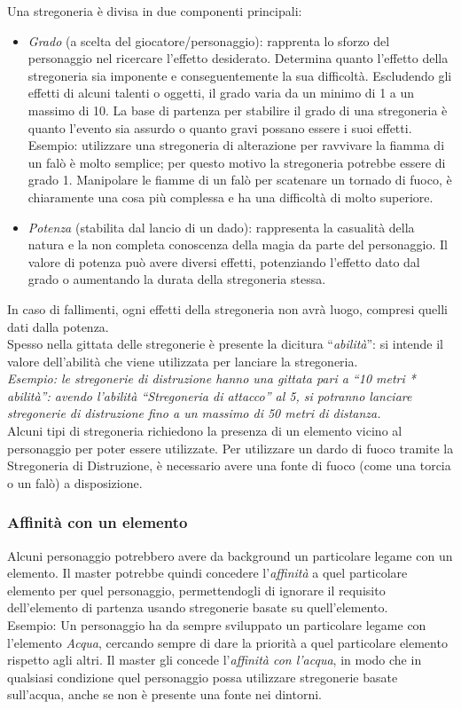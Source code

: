 \documentclass[../manuale_main.tex]{subfiles}
\begin{document}
Una stregoneria è divisa in due componenti principali:
\begin{itemize}
\item \emph{Grado} (a scelta del giocatore/personaggio): rapprenta lo sforzo del personaggio nel ricercare l'effetto desiderato. Determina quanto l'effetto della stregoneria sia imponente e conseguentemente la sua difficoltà. Escludendo gli effetti di alcuni talenti o oggetti, il grado varia da un minimo di 1 a un massimo di 10. La base di partenza per stabilire il grado di una stregoneria è quanto l’evento sia assurdo o quanto gravi possano essere i suoi effetti. Esempio: utilizzare una stregoneria di alterazione per ravvivare la fiamma di un falò è molto semplice; per questo motivo la stregoneria potrebbe essere di grado 1. Manipolare le fiamme di un falò per scatenare un tornado di fuoco, è chiaramente una cosa più complessa e ha una difficoltà di molto superiore.
\item \emph{Potenza} (stabilita dal lancio di un dado): rappresenta la casualità della natura e la non completa conoscenza della magia da parte del personaggio. Il valore di potenza può avere diversi effetti, potenziando l'effetto dato dal grado o aumentando la durata della stregoneria stessa.
\end{itemize}
In caso di fallimenti, ogni effetti della stregoneria non avrà luogo, compresi quelli dati dalla potenza.\\
Spesso nella gittata delle stregonerie è presente la dicitura ``\emph{abilità}'': si intende il valore dell'abilità che viene utilizzata per lanciare la stregoneria.\\
\emph{Esempio: le stregonerie di distruzione hanno una gittata pari a ``10 metri * abilità'': avendo l'abilità ``Stregoneria di attacco'' al 5, si potranno lanciare stregonerie di distruzione fino a un massimo di 50 metri di distanza.}\\
Alcuni tipi di stregoneria richiedono la presenza di un elemento vicino al personaggio per poter essere utilizzate. Per utilizzare un dardo di fuoco tramite la Stregoneria di Distruzione, è necessario avere una fonte di fuoco (come una torcia o un falò) a disposizione.
\subsubsection{Affinità con un elemento}
Alcuni personaggio potrebbero avere da background un particolare legame con un elemento. Il master potrebbe quindi concedere l'\emph{affinità} a quel particolare elemento per quel personaggio, permettendogli di ignorare il requisito dell'elemento di partenza usando stregonerie basate su quell'elemento.\\
Esempio: Un personaggio ha da sempre sviluppato un particolare legame con l'elemento \emph{Acqua}, cercando sempre di dare la priorità a quel particolare elemento rispetto agli altri. Il master gli concede l'\emph{affinità con l'acqua}, in modo che in qualsiasi condizione quel personaggio possa utilizzare stregonerie basate sull'acqua, anche se non è presente una fonte nei dintorni.
\clearpage
\end{document}
